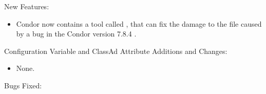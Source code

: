 \noindent New Features:

\begin{itemize}

\item Condor now contains a tool called , 
that can fix the damage to the file  
caused by a bug in the Condor version 7.8.4 .

\end{itemize}

\noindent Configuration Variable and ClassAd Attribute Additions and Changes:

\begin{itemize}

\item None.

\end{itemize}

\noindent Bugs Fixed:

